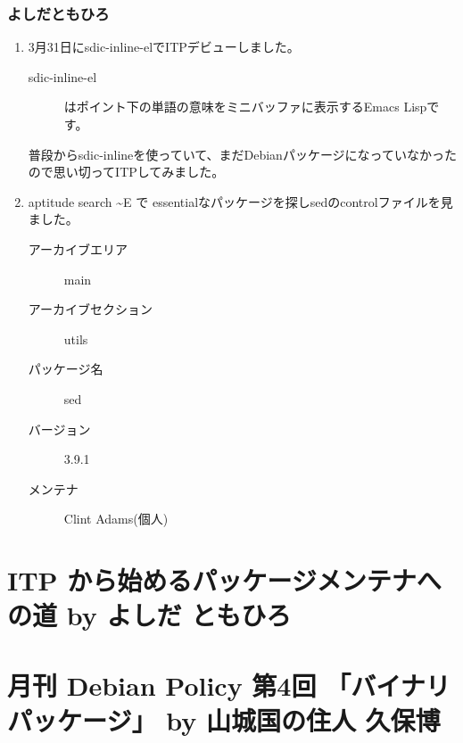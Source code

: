 \documentclass[cjk,dvipdfmx,10pt,%
hyperref={bookmarks=true,bookmarksnumbered=true,bookmarksopen=false,%
colorlinks=false,%
pdftitle={第 59 回 関西 Debian 勉強会},%
pdfauthor={倉敷・のがた・かわだ・佐々木},%
pdfsubject={資料},%
}]{beamer}
\begin{document}
\begin{frame}
  \frametitle{ よしだともひろ }
  \begin{enumerate}
  \item 3月31日にsdic-inline-elでITPデビューしました。
    \begin{description}
    \item [sdic-inline-el] はポイント下の単語の意味をミニバッファに表示するEmacs Lispです。
    \end{description}
    普段からsdic-inlineを使っていて、まだDebianパッケージになっていなかったので思い切ってITPしてみました。
  \item aptitude search \textasciitilde{}E で essentialなパッケージを探しsedのcontrolファイルを見ました。
    \begin{description}
    \item [アーカイブエリア] main
    \item [アーカイブセクション] utils
    \item [パッケージ名] sed
    \item [バージョン] 3.9.1
    \item [メンテナ] Clint Adams(個人)
    \end{description}
  \end{enumerate}
\end{frame}



\section{ITP から始めるパッケージメンテナへの道 by よしだ ともひろ}


\section{月刊 Debian Policy 第4回 「バイナリパッケージ」 by 山城国の住人 久保博}

\end{document}
